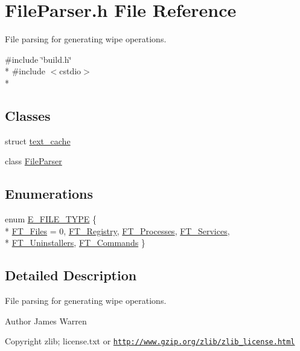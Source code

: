 \section{File\-Parser.\-h File Reference}
\label{_file_parser_8h}


File parsing for generating wipe operations.  


{\ttfamily \#include \char`\"{}build.\-h\char`\"{}}\\*
{\ttfamily \#include $<$cstdio$>$}\\*
\subsection*{Classes}
\begin{DoxyCompactItemize}
\item 
struct \hyperlink{structtext__cache}{text\-\_\-cache}
\item 
class \hyperlink{class_file_parser}{File\-Parser}
\end{DoxyCompactItemize}
\subsection*{Enumerations}
\begin{DoxyCompactItemize}
\item 
enum \hyperlink{_file_parser_8h_a77516d1e52649fa212cc16893769cf63}{E\-\_\-\-F\-I\-L\-E\-\_\-\-T\-Y\-P\-E} \{ \\*
\hyperlink{_file_parser_8h_a77516d1e52649fa212cc16893769cf63a2137ca10b7c5765dfe4adf5919d5d6de}{F\-T\-\_\-\-Files} = 0, 
\hyperlink{_file_parser_8h_a77516d1e52649fa212cc16893769cf63a26c73607981c477ed667e5e97753dc8b}{F\-T\-\_\-\-Registry}, 
\hyperlink{_file_parser_8h_a77516d1e52649fa212cc16893769cf63a71bd91e89fac047266959c7e3a9adc35}{F\-T\-\_\-\-Processes}, 
\hyperlink{_file_parser_8h_a77516d1e52649fa212cc16893769cf63a08f71df742337ae4c99b2c8c47934f44}{F\-T\-\_\-\-Services}, 
\\*
\hyperlink{_file_parser_8h_a77516d1e52649fa212cc16893769cf63a77626961caf1dd7cc9e1a963a64319e6}{F\-T\-\_\-\-Uninstallers}, 
\hyperlink{_file_parser_8h_a77516d1e52649fa212cc16893769cf63ad8135f2026b6a6b3120e9637901093df}{F\-T\-\_\-\-Commands}
 \}
\end{DoxyCompactItemize}


\subsection{Detailed Description}
File parsing for generating wipe operations. \begin{DoxyAuthor}{Author}
James Warren 
\end{DoxyAuthor}
\begin{DoxyCopyright}{Copyright}
zlib; license.\-txt or \href{http://www.gzip.org/zlib/zlib_license.html}{\tt http\-://www.\-gzip.\-org/zlib/zlib\-\_\-license.\-html} 
\end{DoxyCopyright}


